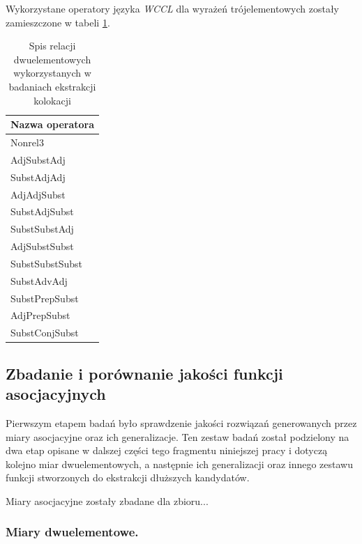 \documentclass[11pt,a4paper]{llncs}
\begin{document}
Wykorzystane operatory języka \emph{WCCL} dla wyrażeń trójelementowych zostały zamieszczone w tabeli \ref{relations_3}.
\begin{table}[h!]
\centering
\begin{tabular}{l}
	\toprule
	Nazwa operatora \\
	\midrule
	Nonrel3\\
	AdjSubstAdj\\
	SubstAdjAdj\\
	AdjAdjSubst\\
	SubstAdjSubst\\
	SubstSubstAdj\\
	AdjSubstSubst\\
	SubstSubstSubst\\
	SubstAdvAdj\\
	SubstPrepSubst\\
	AdjPrepSubst\\
	SubstConjSubst\\
	\bottomrule
\end{tabular}
\caption[Relacje trójelementowe wykorzystane w badaniach]{Spis relacji dwuelementowych wykorzystanych w badaniach ekstrakcji kolokacji}
\label{relations_3}
\end{table}

\subsection{Zbadanie i porównanie jakości funkcji asocjacyjnych}

Pierwszym etapem badań było sprawdzenie jakości rozwiązań generowanych przez miary asocjacyjne oraz ich generalizacje.
Ten zestaw badań został podzielony na dwa etap opisane w dalszej części tego fragmentu niniejszej pracy i dotyczą kolejno miar dwuelementowych, a następnie ich generalizacji oraz innego zestawu funkcji stworzonych do ekstrakcji dłuższych kandydatów.


Miary asocjacyjne zostały zbadane dla zbioru...

\subsubsection{Miary dwuelementowe.}
\end{document}
